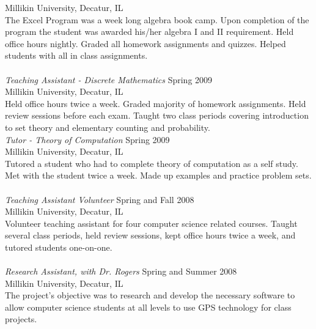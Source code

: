 \documentclass[line,margin]{res}
\begin{document}
\begin{resume}
		  Millikin University, Decatur, IL\\
                  The Excel Program was a week long algebra book camp.
                  Upon completion of the program the student was
                  awarded his/her algebra I and II requirement.  Held
                  office hours nightly.  Graded all homework
                  assignments and quizzes.  Helped students with all
                  in class assignments. \\
                  \\
		  {\sl Teaching Assistant - Discrete Mathematics} \hfill Spring 2009\\
		  Millikin University, Decatur, IL\\
		  Held office hours twice a week.  Graded majority of
                  homework assignments.  Held review sessions before
                  each exam.  Taught two class periods covering
                  introduction to set theory and elementary counting
                  and probability.\\
		  
                  \newpage
	          {\sl Tutor - Theory of Computation} \hfill Spring 2009\\
		  Millikin University, Decatur, IL\\
		  Tutored a student who had to complete theory of
                  computation as a self study.  Met with the student
                  twice a week.  Made up examples and practice problem
                  sets.\\ 
                  \\
		  {\sl Teaching Assistant Volunteer} \hfill Spring and Fall 2008\\
		  Millikin University, Decatur, IL\\
		  Volunteer teaching assistant for four computer
                  science related courses.  Taught several class
                  periods, held review sessions, kept office hours
                  twice a week, and tutored students one-on-one.\\ 
                  \\		  
                  {\sl Research Assistant, with Dr. Rogers} \hfill Spring and Summer 2008\\
		  Millikin University, Decatur, IL\\
                  The project's objective was
                  to research and develop the necessary software to allow computer science students
                  at all levels to use GPS technology for class projects.
                   

\end{resume}
\end{document}
